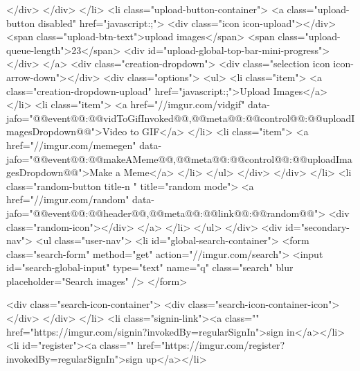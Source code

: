                         </div>
                    </div>
                </li>
                <li class="upload-button-container">
                    <a class="upload-button disabled" href="javascript:;">
                        <div class="icon icon-upload"></div>
                        <span class="upload-btn-text">upload images</span>
                        <span class="upload-queue-length">23</span>
                        <div id="upload-global-top-bar-mini-progress"></div>
                    </a>
                    <div class="creation-dropdown">
                        <div class="selection icon icon-arrow-down"></div>
                        <div class="options">
                            <ul>
                                <li class="item">
                                    <a class="creation-dropdown-upload" href="javascript:;">Upload Images</a>
                                </li>
                                <li class="item">
                                    <a href="//imgur.com/vidgif" data-jafo="{@@event@@:@@vidToGifInvoked@@,@@meta@@:{@@control@@:@@uploadImagesDropdown@@}}">Video to GIF</a>
                                </li>
                                <li class="item">
                                    <a href="//imgur.com/memegen" data-jafo="{@@event@@:@@makeAMeme@@,@@meta@@:{@@control@@:@@uploadImagesDropdown@@}}">Make a Meme</a>
                                </li>
                            </ul>
                        </div>
                    </div>
                </li>
                <li class="random-button title-n " title="random mode">
                    <a href="//imgur.com/random" data-jafo="{@@event@@:@@header@@,@@meta@@:{@@link@@:@@random@@}}">
                        <div class="random-icon"></div>
                    </a>
                </li>
            </ul>
        </div>
        <div id="secondary-nav">
            <ul class="user-nav">
                <li id="global-search-container">
                    <form class="search-form" method="get" action="//imgur.com/search">
                        <input id="search-global-input" type="text" name="q" class="search" blur placeholder="Search images"  />
                    </form>

                    <div class="search-icon-container">
                        <div class="search-icon-container-icon"></div>
                    </div>
                </li>
                                    <li class="signin-link"><a class="" href="https://imgur.com/signin?invokedBy=regularSignIn">sign in</a></li>
                    <li id="register"><a class="" href="https://imgur.com/register?invokedBy=regularSignIn">sign up</a></li>
                
